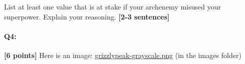 \documentclass[11pt]{article}
\begin{document}
\begin{enumerate}[(a)]
\begin{enumerate}[(i)]
\begin{tcolorbox}[colback=orange!5!white,colframe=orange!75!black]
    List at least one value that is at stake if your archenemy misused your superpower. Explain your reasoning. \textbf{[2-3 sentences]}
    \end{tcolorbox}
    
    
    \end{enumerate}

\end{enumerate}



\pagebreak
\paragraph{Q4:} \textbf{[6 points]} Here is an image: \href{run:images/grizzlypeak-grayscale.png}{grizzlypeak-grayscale.png} (in the images folder)
\end{document}
